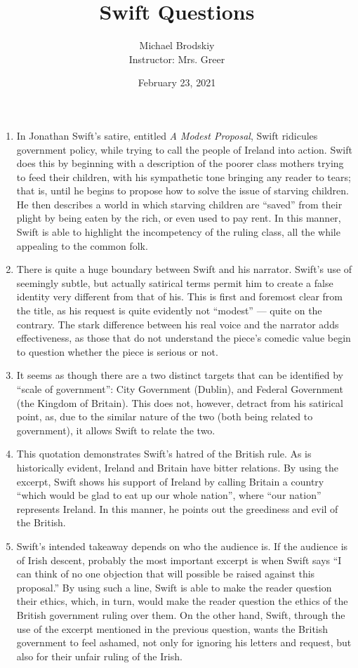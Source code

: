 \documentclass[12pt]{article}
\title{Swift Questions}
\date{February 23, 2021}
\author{Michael Brodskiy\\ \small Instructor: Mrs. Greer}
\begin{document}
    \maketitle

    \begin{enumerate}

      \item In Jonathan Swift's satire, entitled \textit{A Modest Proposal}, Swift ridicules government policy, while trying to call the people of Ireland into action. Swift does this by beginning with a description of the poorer class mothers trying to feed their children, with his sympathetic tone bringing any reader to tears; that is, until he begins to propose how to solve the issue of starving children. He then describes a world in which starving children are “saved” from their plight by being eaten by the rich, or even used to pay rent. In this manner, Swift is able to highlight the incompetency of the ruling class, all the while appealing to the common folk.

      \item There is quite a huge boundary between Swift and his narrator. Swift's use of seemingly subtle, but actually satirical terms permit him to create a false identity very different from that of his. This is first and foremost clear from the title, as his request is quite evidently not “modest” — quite on the contrary. The stark difference between his real voice and the narrator adds effectiveness, as those that do not understand the piece's comedic value begin to question whether the piece is serious or not.

      \item It seems as though there are a two distinct targets that can be identified by “scale of government”: City Government (Dublin), and Federal Government (the Kingdom of Britain). This does not, however, detract from his satirical point, as, due to the similar nature of the two (both being related to government), it allows Swift to relate the two.

      \item This quotation demonstrates Swift's hatred of the British rule. As is historically evident, Ireland and Britain have bitter relations. By using the excerpt, Swift shows his support of Ireland by calling Britain a country “which would be glad to eat up our whole nation”, where “our nation” represents Ireland. In this manner, he points out the greediness and evil of the British.

      \item Swift's intended takeaway depends on who the audience is. If the audience is of Irish descent, probably the most important excerpt is when Swift says “I can think of no one objection that will possible be raised against this proposal.” By using such a line, Swift is able to make the reader question their ethics, which, in turn, would make the reader question the ethics of the British government ruling over them. On the other hand, Swift, through the use of the excerpt mentioned in the previous question, wants the British government to feel ashamed, not only for ignoring his letters and request, but also for their unfair ruling of the Irish.


\end{enumerate}
\end{document}
